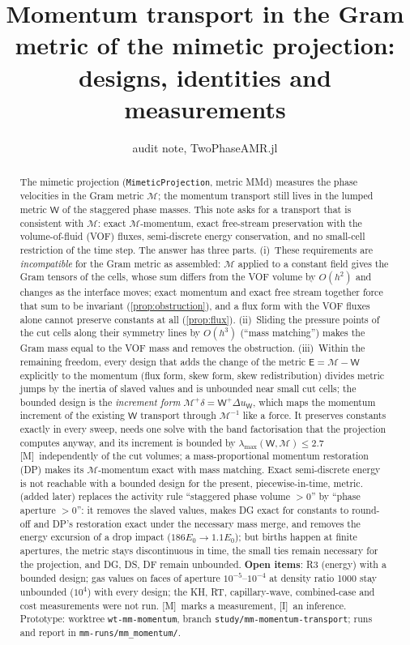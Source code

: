 \documentclass[11pt,a4paper]{article}
\title{Momentum transport in the Gram metric of the mimetic projection:\\
designs, identities and measurements}
\author{audit note, TwoPhaseAMR.jl}
\date{}
\newcommand{\meas}{\textsf{[M]}}
\newcommand{\infr}{\textsf{[I]}}
\newcommand{\code}[1]{\texttt{#1}}
\newcommand{\MM}{\mathcal M}
\newcommand{\W}{\mathsf W}
\newcommand{\E}{\mathsf E}
\begin{document}
\maketitle
\begin{abstract}
The mimetic projection (\code{MimeticProjection}, metric MMd) measures the phase velocities
in the Gram metric $\MM$; the momentum transport still lives in the lumped metric $\W$ of
the staggered phase masses.  This note asks for a transport that is consistent with $\MM$:
exact $\MM$-momentum, exact free-stream preservation with the volume-of-fluid (VOF) fluxes,
semi-discrete energy conservation, and no small-cell restriction of the time step.  The
answer has three parts.  (i)~These requirements are \emph{incompatible} for the Gram metric
as assembled: $\MM$ applied to a constant field gives the Gram tensors of the cells, whose
sum differs from the VOF volume by $O(h^2)$ and changes as the interface moves; exact
momentum and exact free stream together force that sum to be invariant
(\cref{prop:obstruction}), and a flux form with the VOF fluxes alone cannot preserve
constants at all (\cref{prop:flux}).  (ii)~Sliding the pressure points of the cut cells
along their symmetry lines by $O(h^3)$ (``mass matching'') makes the Gram mass equal to the
VOF mass and removes the obstruction.  (iii)~Within the remaining freedom, every design that
adds the change of the metric $\E=\MM-\W$ explicitly to the momentum (flux form, skew form,
skew redistribution) divides metric jumps by the inertia of slaved values and is unbounded
near small cut cells; the bounded design is the \emph{increment form}
$\MM^+\delta=\W^+\Delta u_\W$, which maps the momentum increment of the existing $\W$
transport through $\MM^{-1}$ like a force.  It preserves constants exactly in every sweep,
needs one solve with the band factorisation that the projection computes anyway, and its
increment is bounded by $\lambda_{\max}(\W,\MM)\le2.7$ \meas\ independently of the cut
volumes; a mass-proportional momentum restoration (DP) makes its $\MM$-momentum exact with
mass matching.  Exact semi-discrete energy is not reachable with a bounded design for the
present, piecewise-in-time, metric.   (added later) replaces the activity
rule ``staggered phase volume $>0$'' by ``phase aperture $>0$'': it removes the slaved values,
makes DG exact for constants to round-off and DP's restoration exact under the necessary mass
merge, and removes the energy excursion of a drop impact ($186E_0\to1.1E_0$); but births happen
at finite apertures, the metric stays discontinuous in time, the small ties remain necessary
for the projection, and DG, DS, DF remain unbounded.  \textbf{Open items}: R3 (energy) with a
bounded design; gas values on faces of aperture $10^{-5}$--$10^{-4}$ at density ratio 1000 stay
unbounded ($10^4$) with every design; the KH, RT, capillary-wave, combined-case and cost
measurements were not run.  \meas\ marks a measurement, \infr\ an inference.
Prototype: worktree \code{wt-mm-momentum}, branch \code{study/mm-momentum-transport};
runs and report in \code{mm-runs/mm\_momentum/}.
\end{abstract}
\end{document}
